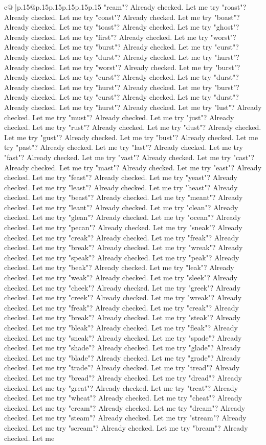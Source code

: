 \documentclass{article}
\begin{document}
{\begin{supertabular}{c@{$\;$}|p{.15\linewidth}@{}p{.15\linewidth}p{.15\linewidth}p{.15\linewidth}p{.15\linewidth}p{.15\linewidth}}
{{{"ream"? Already checked. Let me try "roast"? Already checked. Let me try "coast"? Already checked. Let me try "boast"? Already checked. Let me try "toast"? Already checked. Let me try "ghost"? Already checked. Let me try "first"? Already checked. Let me try "worst"? Already checked. Let me try "burst"? Already checked. Let me try "curst"? Already checked. Let me try "durst"? Already checked. Let me try "hurst"? Already checked. Let me try "worst"? Already checked. Let me try "burst"? Already checked. Let me try "curst"? Already checked. Let me try "durst"? Already checked. Let me try "hurst"? Already checked. Let me try "burst"? Already checked. Let me try "curst"? Already checked. Let me try "durst"? Already checked. Let me try "hurst"? Already checked. Let me try "lust"? Already checked. Let me try "must"? Already checked. Let me try "just"? Already checked. Let me try "rust"? Already checked. Let me try "dust"? Already checked. Let me try "gust"? Already checked. Let me try "bust"? Already checked. Let me try "past"? Already checked. Let me try "last"? Already checked. Let me try "fast"? Already checked. Let me try "vast"? Already checked. Let me try "cast"? Already checked. Let me try "mast"? Already checked. Let me try "east"? Already checked. Let me try "feast"? Already checked. Let me try "yeast"? Already checked. Let me try "least"? Already checked. Let me try "heast"? Already checked. Let me try "beast"? Already checked. Let me try "meant"? Already checked. Let me try "leant"? Already checked. Let me try "clean"? Already checked. Let me try "glean"? Already checked. Let me try "ocean"? Already checked. Let me try "pecan"? Already checked. Let me try "sneak"? Already checked. Let me try "creak"? Already checked. Let me try "freak"? Already checked. Let me try "break"? Already checked. Let me try "wreak"? Already checked. Let me try "speak"? Already checked. Let me try "peak"? Already checked. Let me try "beak"? Already checked. Let me try "leak"? Already checked. Let me try "weak"? Already checked. Let me try "sleek"? Already checked. Let me try "cheek"? Already checked. Let me try "greek"? Already checked. Let me try "creek"? Already checked. Let me try "wreak"? Already checked. Let me try "freak"? Already checked. Let me try "creak"? Already checked. Let me try "break"? Already checked. Let me try "steak"? Already checked. Let me try "bleak"? Already checked. Let me try "fleak"? Already checked. Let me try "sneak"? Already checked. Let me try "spade"? Already checked. Let me try "shade"? Already checked. Let me try "glade"? Already checked. Let me try "blade"? Already checked. Let me try "grade"? Already checked. Let me try "trade"? Already checked. Let me try "tread"? Already checked. Let me try "bread"? Already checked. Let me try "dread"? Already checked. Let me try "great"? Already checked. Let me try "treat"? Already checked. Let me try "wheat"? Already checked. Let me try "cheat"? Already checked. Let me try "cream"? Already checked. Let me try "dream"? Already checked. Let me try "steam"? Already checked. Let me try "stream"? Already checked. Let me try "scream"? Already checked. Let me try "bream"? Already checked. Let me }}}
\end{supertabular}}
\end{document}
